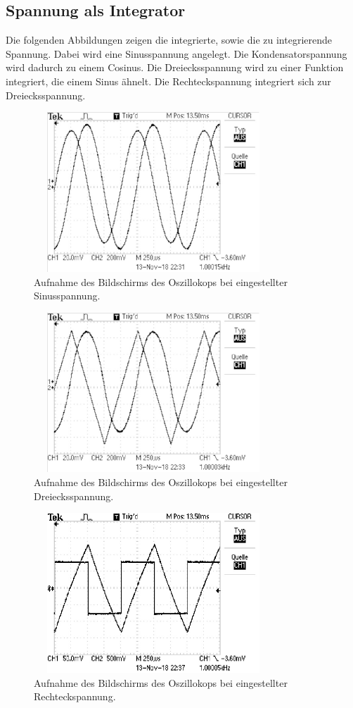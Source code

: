 \subsection{Spannung als Integrator}
Die folgenden Abbildungen zeigen die integrierte, sowie die zu integrierende Spannung.
Dabei wird eine Sinusspannung angelegt. Die Kondensatorspannung wird dadurch zu einem Cosinus. Die Dreiecksspannung wird zu einer Funktion integriert, die einem Sinus ähnelt. Die Rechteckspannung integriert sich zur Dreiecksspannung. \newline \newline \newline %
\begin{figure}
  \centering
  \includegraphics[width=9cm, height=6cm]{build/integrator1.pdf}
  \caption{Aufnahme des Bildschirms des Oszillokops bei eingestellter Sinusspannung.}
  \label{fig: sinus}
\end{figure}

\begin{figure}
  \centering
  \includegraphics[width=9cm, height=6cm]{build/integrator2.pdf}
  \caption{Aufnahme des Bildschirms des Oszillokops bei eingestellter Dreiecksspannung.}
  \label{fig: dreieck}
\end{figure}

\begin{figure}
  \centering
  \includegraphics[width=9cm, height=6cm]{build/integrator3.pdf}
  \caption{Aufnahme des Bildschirms des Oszillokops bei eingestellter Rechteckspannung.}
  \label{fig: rechteck}
\end{figure}



